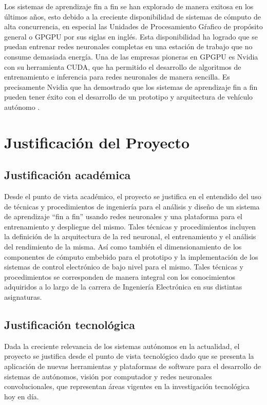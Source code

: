 Los sistemas de aprendizaje fin a fin se han explorado de manera exitosa en los últimos años, esto debido a la creciente
disponibilidad de sistemas de cómputo de alta concurrencia, en especial las Unidades de Procesamiento Gŕafico de propósito
general o GPGPU por sus siglas en inglés. Esta disponibilidad ha logrado que se puedan entrenar redes neuronales completas 
en una estación de trabajo que no consume demasiada energía. Una de las empresas pioneras en GPGPU es Nvidia con su herramienta 
CUDA, que ha permitido el desarrollo de algoritmos de entrenamiento e inferencia para redes neuronales de manera sencilla. Es 
precisamente Nvidia que ha demostrado que los sistemas de aprendizaje fin a fin pueden tener éxito con el desarrollo de un 
prototipo y arquitectura de vehículo autónomo \cite{bojarski2016end}.



\section{Justificación del Proyecto}

\subsection{Justificación académica}

Desde el punto de vista académico, el proyecto se justifica en el entendido del uso de técnicas y procedimientos 
de ingeniería para el análisis y diseño de un sistema de aprendizaje “fin a fin” usando redes neuronales y una plataforma 
para el entrenamiento y despliegue del mismo. Tales técnicas y procedimientos incluyen la definición de 
la arquitectura de la red neuronal, el entrenamiento y el análisis del rendimiento de la misma. Así como 
también el dimensionamiento de los componentes de cómputo embebido para el prototipo y la implementación de 
los sistemas de control electrónico de bajo nivel para el mismo. Tales técnicas y 
procedimientos se corresponden de manera integral con los conocimientos adquiridos a lo largo de la carrera 
de Ingeniería Electrónica en sus distintas asignaturas.

\subsection{Justificación tecnológica}

Dada la creciente relevancia de los sistemas autónomos en la actualidad, el proyecto se justifica 
desde el punto de vista tecnológico dado que se presenta la aplicación de nuevas
herramientas y plataformas de software para el desarrollo de sistemas de autónomos, visión por computador 
y redes neuronales convolucionales, que representan áreas vigentes en la investigación tecnológica hoy en día.

